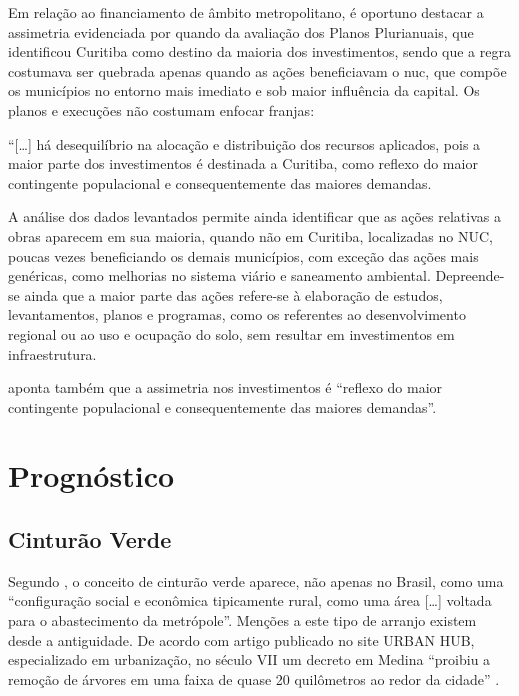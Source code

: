 	Em relação ao financiamento de âmbito metropolitano, é oportuno destacar a assimetria evidenciada por  quando da avaliação dos Planos Plurianuais, que identificou Curitiba como destino da maioria dos investimentos, sendo que a regra costumava ser quebrada apenas quando as ações beneficiavam o \gls{nuc}, que compõe os municípios no entorno mais imediato e sob maior influência da capital. Os planos e execuções não costumam enfocar franjas:
	
	\begin{citacao}
		``[\dots] há desequilíbrio na alocação e distribuição dos recursos aplicados, pois a maior parte dos investimentos é destinada a Curitiba, como reflexo do maior contingente populacional e consequentemente das maiores demandas.
		
		A análise dos dados levantados permite ainda identificar que as ações relativas a obras aparecem em sua maioria, quando não em Curitiba, localizadas no NUC, poucas vezes beneficiando os demais municípios, com exceção das ações mais genéricas, como melhorias
		no sistema viário e saneamento ambiental. Depreende-se ainda que a maior parte das ações refere-se à elaboração de estudos, levantamentos, planos e programas, como os referentes ao desenvolvimento regional ou ao uso e ocupação do solo, sem resultar em investimentos em infraestrutura.
	\end{citacao}

	 aponta também que a assimetria nos investimentos é ``reflexo do maior contingente populacional e consequentemente das maiores demandas''.
	
	\chapter{Prognóstico} \label{sec:prognostico}
	
	\section{Cinturão Verde}
	
	Segundo , o conceito de cinturão verde aparece, não apenas no Brasil, como uma ``configuração social e econômica tipicamente rural, como uma área [\dots] voltada para o abastecimento da metrópole''. Menções a este tipo de arranjo existem desde a antiguidade. De acordo com artigo publicado no site URBAN HUB, especializado em urbanização, no século VII um decreto em Medina ``proibiu a remoção de árvores em uma faixa de quase 20 quilômetros ao redor da cidade'' \cite{urbanhub2017a}.
	
